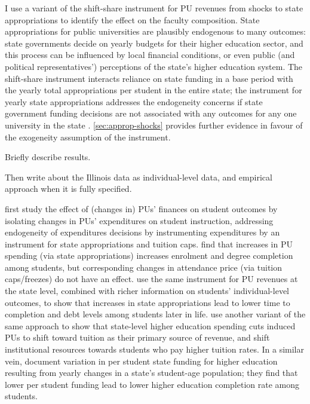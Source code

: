 \documentclass[notitlepage,12pt]{article}
\begin{document}
I use a variant of the \cite{NBERw23736,NBERw27885} shift-share instrument for PU revenues from shocks to state appropriations to identify the effect on the faculty composition.
State appropriations for public universities are plausibly endogenous to many outcomes: state governments decide on yearly budgets for their higher education sector, and this process can be influenced by local financial conditions, or even public (and political representatives') perceptions of the state's higher education system.
The shift-share instrument interacts reliance on state funding in a base period with the yearly total appropriations per student in the entire state;
the instrument for yearly state appropriations addresses the endogeneity concerns if state government funding decisions are not associated with any outcomes for any one university in the state \citep{NBERw27885}.
\autoref{sec:approp-shocks} provides further evidence in favour of the exogeneity assumption of the instrument.

Briefly describe results.

Then write about the Illinois data as individual-level data, and empirical approach when it is fully specified.

\cite{NBERw23736} first study the effect of (changes in) PUs' finances on student outcomes by isolating changes in PUs' expenditures on student instruction, addressing endogeneity of expenditures decisions by instrumenting expenditures by an instrument for state appropriations and tuition caps.
\cite{NBERw23736} find that increases in PU spending (via state appropriations) increases enrolment and degree completion among students, but corresponding changes in attendance price (via tuition caps/freezes) do not have an effect.
\cite{chakrabarti2018effect,NBERw27885} use the same instrument for PU revenues at the state level, combined with richer information on students' individual-level outcomes, to show that increases in state appropriations lead to lower time to completion and debt levels among students later in life.
\cite{bound2019public} use another variant of the same approach to show that state-level higher education spending cuts induced PUs to shift toward tuition as their primary source of revenue, and shift institutional resources towards students who pay higher tuition rates.
In a similar vein, \cite{bound2007cohort} document variation in per student state funding for higher education resulting from yearly changes in a state's student-age population; they find that lower per student funding lead to lower higher education completion rate among students.
\end{document}
